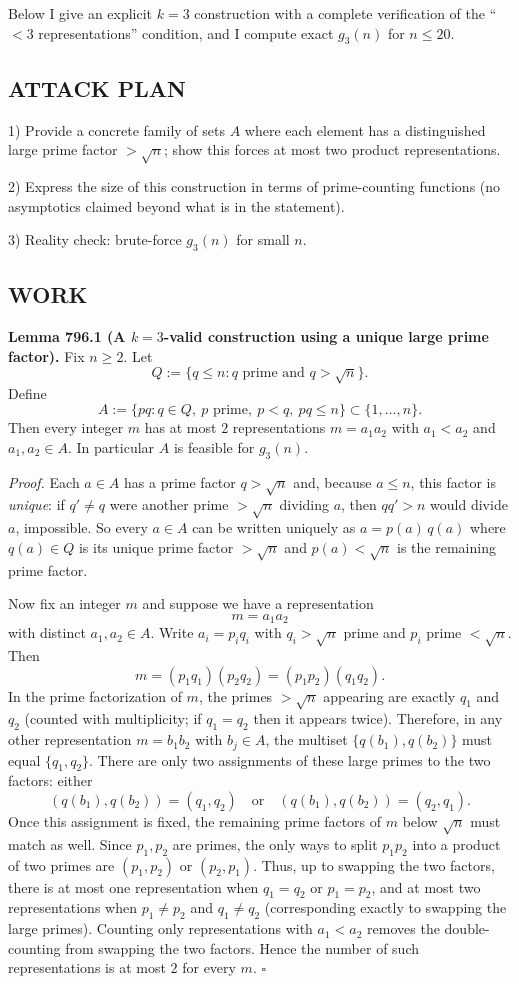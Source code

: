 Below I give an explicit $k=3$ construction with a complete verification of the ``$<3$ representations'' condition, and I compute exact $g_3(n)$ for $n\le 20$.

\subsection*{ATTACK PLAN}
1) Provide a concrete family of sets $A$ where each element has a distinguished large prime factor $>\sqrt n$; show this forces at most two product representations.

2) Express the size of this construction in terms of prime-counting functions (no asymptotics claimed beyond what is in the statement).

3) Reality check: brute-force $g_3(n)$ for small $n$.

\subsection*{WORK}
\textbf{Lemma 796.1 (A $k=3$-valid construction using a unique large prime factor).}
Fix $n\ge 2$. Let
\[
Q:=\{q\le n: q\text{ prime and }q>\sqrt n\}.
\]
Define
\[
A:=\{pq: q\in Q,\ p\text{ prime},\ p<q,\ pq\le n\} \subset\{1,\dots,n\}.
\]
Then every integer $m$ has at most $2$ representations $m=a_1a_2$ with $a_1<a_2$ and $a_1,a_2\in A$. In particular $A$ is feasible for $g_3(n)$.

\emph{Proof.}
Each $a\in A$ has a prime factor $q>\sqrt n$ and, because $a\le n$, this factor is \emph{unique}: if $q'\ne q$ were another prime $>\sqrt n$ dividing $a$, then $qq'>n$ would divide $a$, impossible.
So every $a\in A$ can be written uniquely as $a=p(a)\,q(a)$ where $q(a)\in Q$ is its unique prime factor $>\sqrt n$ and $p(a)<\sqrt n$ is the remaining prime factor.

Now fix an integer $m$ and suppose we have a representation
\[
 m=a_1a_2
\]
with distinct $a_1,a_2\in A$.
Write $a_i=p_i q_i$ with $q_i>\sqrt n$ prime and $p_i$ prime $<\sqrt n$.
Then
\[
 m = (p_1q_1)(p_2q_2) = (p_1p_2)(q_1q_2).
\]
In the prime factorization of $m$, the primes $>\sqrt n$ appearing are exactly $q_1$ and $q_2$ (counted with multiplicity; if $q_1=q_2$ then it appears twice).
Therefore, in any other representation $m=b_1b_2$ with $b_j\in A$, the multiset $\{q(b_1),q(b_2)\}$ must equal $\{q_1,q_2\}$.
There are only two assignments of these large primes to the two factors: either
\[(q(b_1),q(b_2))=(q_1,q_2)\quad\text{or}\quad(q(b_1),q(b_2))=(q_2,q_1).
\]
Once this assignment is fixed, the remaining prime factors of $m$ below $\sqrt n$ must match as well. Since $p_1,p_2$ are primes, the only ways to split $p_1p_2$ into a product of two primes are $(p_1,p_2)$ or $(p_2,p_1)$.
Thus, up to swapping the two factors, there is at most one representation when $q_1=q_2$ or $p_1=p_2$, and at most two representations when $p_1\ne p_2$ and $q_1\ne q_2$ (corresponding exactly to swapping the large primes).
Counting only representations with $a_1<a_2$ removes the double-counting from swapping the two factors.
Hence the number of such representations is at most $2$ for every $m$.
\hfill$\square$

